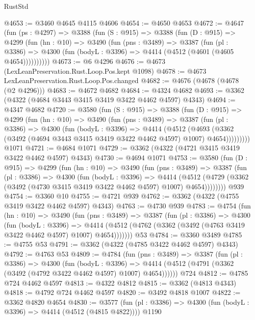 \begin{lexlean}{RustStd}
\begin{coremodule}
@4653 := @3460 @4645 @4115 @4606
@4654 := @4650 @4653
@4672 := @4647
    (fun (ps : @4297) =>
    @3388
      (fun (S : @915) =>
      @3388
        (fun (D : @915) =>
        @4299
          (fun (hn : @10) =>
          @3490
            (fun (pns : @3489) =>
            @3387
              (fun (pl : @3386) =>
              @4300 (fun (bodyL : @3396) => @4414 (@4512 (@4601 (@4605 @4654))))))))))
@4673 := @6 @4296
@4676 := @4673 (LexLeanPreservation.Rust.Loop.Pos.kept @1098)
@4678 := @4673 LexLeanPreservation.Rust.Loop.Pos.changed
@4682 := @4676 (@4678 (@4678 (@2 @4296)))
@4683 := @4672 @4682
@4684 := @4324 @4682
@4693 := @3362 (@4322 (@4684 @3443 @3415 @3419 @3422 @4462 @4597) @4343)
@4694 := @4347 @4682
@4720 := @3580
    (fun (S : @915) =>
    @3388
      (fun (D : @915) =>
      @4299
        (fun (hn : @10) =>
        @3490
          (fun (pns : @3489) =>
          @3387
            (fun (pl : @3386) =>
            @4300
              (fun (bodyL : @3396) =>
              @4414
                (@4512
                  (@4693
                    (@3362 (@3492 (@4694 @3443 @3415 @3419 @3422 @4462 @4597) @1007) @4654)))))))))
    @1071
@4721 := @4684 @1071
@4729 := @3362 (@4322 (@4721 @3415 @3419 @3422 @4462 @4597) @4343)
@4730 := @4694 @1071
@4753 := @3580
    (fun (D : @915) =>
    @4299
      (fun (hn : @10) =>
      @3490
        (fun (pns : @3489) =>
        @3387
          (fun (pl : @3386) =>
          @4300
            (fun (bodyL : @3396) =>
            @4414
              (@4512 (@4729 (@3362 (@3492 (@4730 @3415 @3419 @3422 @4462 @4597) @1007) @4654))))))))
    @939
@4754 := @3360 @10
@4755 := @4721 @939
@4762 := @3362 (@4322 (@4755 @3419 @3422 @4462 @4597) @4343)
@4763 := @4730 @939
@4783 := @4754
    (fun (hn : @10) =>
    @3490
      (fun (pns : @3489) =>
      @3387
        (fun (pl : @3386) =>
        @4300
          (fun (bodyL : @3396) =>
          @4414 (@4512 (@4762 (@3362 (@3492 (@4763 @3419 @3422 @4462 @4597) @1007) @4654)))))))
    @53
@4784 := @3360 @3489
@4785 := @4755 @53
@4791 := @3362 (@4322 (@4785 @3422 @4462 @4597) @4343)
@4792 := @4763 @53
@4809 := @4784
    (fun (pns : @3489) =>
    @3387
      (fun (pl : @3386) =>
      @4300
        (fun (bodyL : @3396) =>
        @4414 (@4512 (@4791 (@3362 (@3492 (@4792 @3422 @4462 @4597) @1007) @4654))))))
    @724
@4812 := @4785 @724 @4462 @4597
@4813 := @4322 @4812
@4815 := @3362 (@4813 @4343)
@4818 := @4792 @724 @4462 @4597
@4820 := @3492 @4818 @1007
@4822 := @3362 @4820 @4654
@4830 := @3577
    (fun (pl : @3386) => @4300 (fun (bodyL : @3396) => @4414 (@4512 (@4815 @4822))))
    @1190

\end{coremodule}
\end{lexlean}
